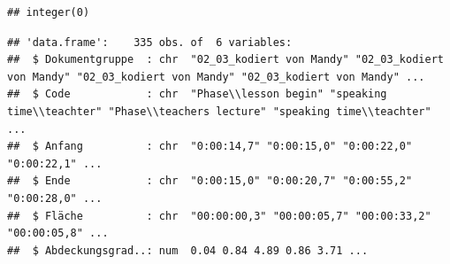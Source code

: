 \documentclass[
  english,
  man,floatsintext]{apa6}
\begin{document}
\begin{verbatim}
## integer(0)
\end{verbatim}

\begin{verbatim}
## 'data.frame':    335 obs. of  6 variables:
##  $ Dokumentgruppe  : chr  "02_03_kodiert von Mandy" "02_03_kodiert von Mandy" "02_03_kodiert von Mandy" "02_03_kodiert von Mandy" ...
##  $ Code            : chr  "Phase\\lesson begin" "speaking time\\teachter" "Phase\\teachers lecture" "speaking time\\teachter" ...
##  $ Anfang          : chr  "0:00:14,7" "0:00:15,0" "0:00:22,0" "0:00:22,1" ...
##  $ Ende            : chr  "0:00:15,0" "0:00:20,7" "0:00:55,2" "0:00:28,0" ...
##  $ Fläche          : chr  "00:00:00,3" "00:00:05,7" "00:00:33,2" "00:00:05,8" ...
##  $ Abdeckungsgrad..: num  0.04 0.84 4.89 0.86 3.71 ...
\end{verbatim}
\end{document}
